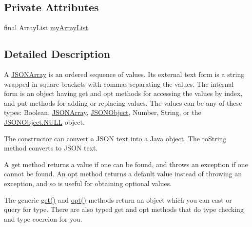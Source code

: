 \subsection*{Private Attributes}
\begin{DoxyCompactItemize}
\item 
final Array\-List \hyperlink{classorg_1_1json_1_1_j_s_o_n_array_a0ae87624145bd5bec5fca66d37a5e794}{my\-Array\-List}
\end{DoxyCompactItemize}


\subsection{Detailed Description}
A \hyperlink{classorg_1_1json_1_1_j_s_o_n_array}{J\-S\-O\-N\-Array} is an ordered sequence of values. Its external text form is a string wrapped in square brackets with commas separating the values. The internal form is an object having {\ttfamily get} and {\ttfamily opt} methods for accessing the values by index, and {\ttfamily put} methods for adding or replacing values. The values can be any of these types\-: {\ttfamily Boolean}, {\ttfamily \hyperlink{classorg_1_1json_1_1_j_s_o_n_array}{J\-S\-O\-N\-Array}}, {\ttfamily \hyperlink{classorg_1_1json_1_1_j_s_o_n_object}{J\-S\-O\-N\-Object}}, {\ttfamily Number}, {\ttfamily String}, or the {\ttfamily \hyperlink{classorg_1_1json_1_1_j_s_o_n_object_a01c74a31a1abfd34ab13beb9347855ac}{J\-S\-O\-N\-Object.\-N\-U\-L\-L} object}. 

The constructor can convert a J\-S\-O\-N text into a Java object. The {\ttfamily to\-String} method converts to J\-S\-O\-N text. 

A {\ttfamily get} method returns a value if one can be found, and throws an exception if one cannot be found. An {\ttfamily opt} method returns a default value instead of throwing an exception, and so is useful for obtaining optional values. 

The generic {\ttfamily \hyperlink{classorg_1_1json_1_1_j_s_o_n_array_a3a8413753f53e0c0a5e008816c915eae}{get()}} and {\ttfamily \hyperlink{classorg_1_1json_1_1_j_s_o_n_array_a19aa83c80cded3d0a252c212ceca7954}{opt()}} methods return an object which you can cast or query for type. There are also typed {\ttfamily get} and {\ttfamily opt} methods that do type checking and type coercion for you. 

